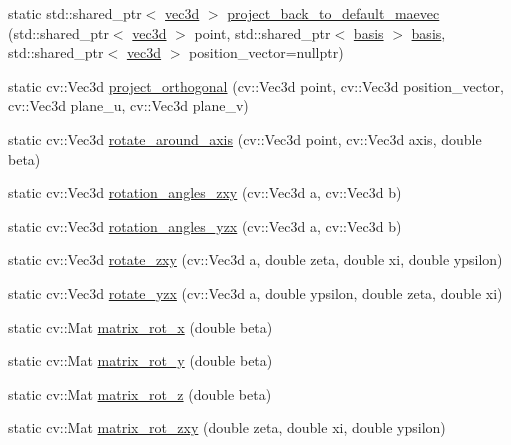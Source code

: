 \begin{DoxyCompactItemize}
\item 
static std\-::shared\-\_\-ptr$<$ \hyperlink{classmae_1_1math_1_1vec3d}{vec3d} $>$ \hyperlink{classmae_1_1math_1_1internal__math_a786abb98cf100a3ed723a3bc9f376d70}{project\-\_\-back\-\_\-to\-\_\-default\-\_\-maevec} (std\-::shared\-\_\-ptr$<$ \hyperlink{classmae_1_1math_1_1vec3d}{vec3d} $>$ point, std\-::shared\-\_\-ptr$<$ \hyperlink{classmae_1_1math_1_1basis}{basis} $>$ \hyperlink{classmae_1_1math_1_1basis}{basis}, std\-::shared\-\_\-ptr$<$ \hyperlink{classmae_1_1math_1_1vec3d}{vec3d} $>$ position\-\_\-vector=nullptr)
\item 
static cv\-::\-Vec3d \hyperlink{classmae_1_1math_1_1internal__math_aa9db8f1fec2cd79090b23480d148726d}{project\-\_\-orthogonal} (cv\-::\-Vec3d point, cv\-::\-Vec3d position\-\_\-vector, cv\-::\-Vec3d plane\-\_\-u, cv\-::\-Vec3d plane\-\_\-v)
\item 
static cv\-::\-Vec3d \hyperlink{classmae_1_1math_1_1internal__math_a816f1528545c57b991524df43e2cf21c}{rotate\-\_\-around\-\_\-axis} (cv\-::\-Vec3d point, cv\-::\-Vec3d axis, double beta)
\item 
static cv\-::\-Vec3d \hyperlink{classmae_1_1math_1_1internal__math_aebb42af130fa19a6e1d698eac6acbf1f}{rotation\-\_\-angles\-\_\-zxy} (cv\-::\-Vec3d a, cv\-::\-Vec3d b)
\item 
static cv\-::\-Vec3d \hyperlink{classmae_1_1math_1_1internal__math_a49b242a898de560171f9c521fce5f503}{rotation\-\_\-angles\-\_\-yzx} (cv\-::\-Vec3d a, cv\-::\-Vec3d b)
\item 
static cv\-::\-Vec3d \hyperlink{classmae_1_1math_1_1internal__math_ae3708896b51b1cd91c5fe02fcd108334}{rotate\-\_\-zxy} (cv\-::\-Vec3d a, double zeta, double xi, double ypsilon)
\item 
static cv\-::\-Vec3d \hyperlink{classmae_1_1math_1_1internal__math_a94b4522f4efe912249e39b8c3ea7709e}{rotate\-\_\-yzx} (cv\-::\-Vec3d a, double ypsilon, double zeta, double xi)
\item 
static cv\-::\-Mat \hyperlink{classmae_1_1math_1_1internal__math_aef89296a8dda8603ab94f073adcc65f3}{matrix\-\_\-rot\-\_\-x} (double beta)
\item 
static cv\-::\-Mat \hyperlink{classmae_1_1math_1_1internal__math_a626c276471efbddd086ca1d333dc75f8}{matrix\-\_\-rot\-\_\-y} (double beta)
\item 
static cv\-::\-Mat \hyperlink{classmae_1_1math_1_1internal__math_a77781862472a196ad64104b953f5a3aa}{matrix\-\_\-rot\-\_\-z} (double beta)
\item 
static cv\-::\-Mat \hyperlink{classmae_1_1math_1_1internal__math_a6d752ab2e9cffb3ab5978f60a11b4854}{matrix\-\_\-rot\-\_\-zxy} (double zeta, double xi, double ypsilon)

\end{DoxyCompactItemize}
